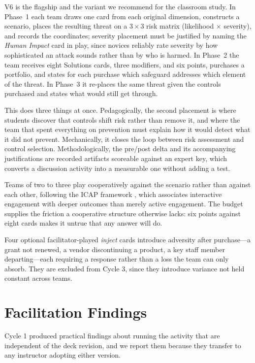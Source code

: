 \documentclass[10pt,twocolumn,letterpaper]{article}
\begin{document}
V6 is the flagship and the variant we recommend for the classroom study. In
Phase~1 each team draws one card from each original dimension, constructs a
scenario, places the resulting threat on a $3\times3$ risk matrix (likelihood
$\times$ severity), and records the coordinates; severity placement must be
justified by naming the \emph{Human Impact} card in play, since novices reliably
rate severity by how sophisticated an attack sounds rather than by who is
harmed. In Phase~2 the team receives
eight Solutions cards, three modifiers, and six points, purchases a portfolio,
and states for each purchase which safeguard addresses which element of the
threat. In Phase~3 it re-places the same threat given the controls purchased and
states what would still get through.

This does three things at once. Pedagogically, the second placement is where
students discover that controls shift risk rather than remove it, and where the
team that spent everything on prevention must explain how it would detect what
it did not prevent. Mechanically, it closes the loop between risk assessment and
control selection. Methodologically, the pre/post delta and its accompanying
justifications are recorded artifacts scoreable against an expert key, which
converts a discussion activity into a measurable one without adding a test.

Teams of two to three play cooperatively against the scenario rather than
against each other, following the ICAP framework \cite{chi2014icap}, which
associates interactive engagement with deeper outcomes than merely active
engagement. The budget supplies the friction a cooperative structure otherwise
lacks: six points against eight cards makes it untrue that any answer will do.

Four optional facilitator-played \emph{inject} cards introduce adversity after
purchase---a grant not renewed, a vendor discontinuing a product, a key staff
member departing---each requiring a response rather than a loss the team can only
absorb. They are excluded from Cycle 3, since they introduce variance not held
constant across teams.

\section{Facilitation Findings}
\label{sec:facilitation}

Cycle 1 produced practical findings about running the activity that are
independent of the deck revision, and we report them because they transfer to
any instructor adopting either version.
\end{document}
